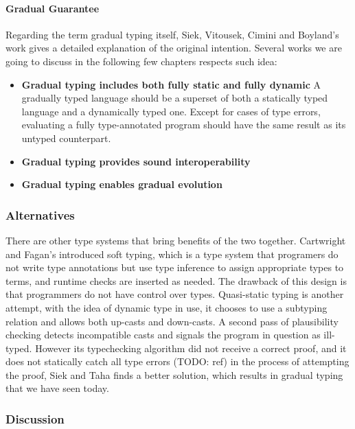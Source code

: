 


\paragraph{Gradual Guarantee}

Regarding the term gradual typing itself,
Siek, Vitousek, Cimini and Boyland's work gives a detailed explanation of
the original intention.
Several works we are going to discuss in the following few chapters respects
such idea:

\begin{itemize}
	\item \textbf{Gradual typing includes both fully static and fully dynamic}
	A gradually typed language should be a superset of both a statically typed
	language and a dynamically typed one.
	Except for cases of type errors, evaluating a fully type-annotated program
	should have the same result as its untyped counterpart.
	\item \textbf{Gradual typing provides sound interoperability}
	\item \textbf{Gradual typing enables gradual evolution}
\end{itemize}


\subsubsection{Alternatives}

There are other type systems that bring benefits of the two together.
Cartwright and Fagan's introduced soft typing, which is a type system
that programers do not write type annotations but use type inference to
assign appropriate types to terms, and runtime checks are inserted as needed.
The drawback of this design is that programmers do not have control over types.
Quasi-static typing is another attempt, with the idea of dynamic type in use,
it chooses to use a subtyping relation and allows both up-casts and down-casts.
A second pass of plausibility checking detects incompatible casts and signals the program
in question as ill-typed. However its typechecking algorithm did not receive a correct proof,
and it does not statically catch all type errors (TODO: ref)
in the process of attempting the proof, Siek and Taha finds a better solution, 
which results in gradual typing that we have seen today.

\subsubsection{Discussion}

